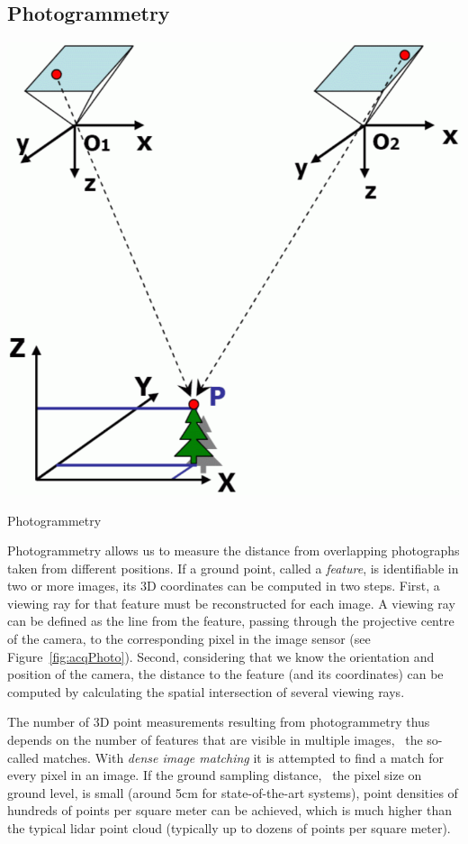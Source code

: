 \subsection{Photogrammetry}
\begin{marginfigure}
	\centering
	\includegraphics[width=\textwidth]{figs/photogrammetry.png}
	\caption{Photogrammetry}%
	\label{fig:acqPhoto}
\end{marginfigure}
Photogrammetry allows us to measure the distance from overlapping photographs taken from different positions. 
If a ground point, called a \emph{feature}, is identifiable in two or more images, its 3D coordinates can be computed in two steps. 
First, a viewing ray for that feature must be reconstructed for each image. 
A viewing ray can be defined as the line from the feature, passing through the projective centre of the camera, to the corresponding pixel in the image sensor (see Figure~\ref{fig:acqPhoto}). 
Second, considering that we know the orientation and position of the camera, the distance to the feature (and its coordinates) can be computed by calculating the spatial intersection of several viewing rays.


The number of 3D point measurements resulting from photogrammetry thus depends on the number of features that are visible in multiple images, \ie\ the so-called matches.
With \emph{dense image matching} 
it is attempted to find a match for every pixel in an image. 
If the ground sampling distance, \ie\ the pixel size on ground level, is small (around 5cm for state-of-the-art systems), point densities of hundreds of points per square meter can be achieved, which is much higher than the typical lidar point cloud (typically up to dozens of points per square meter). 

